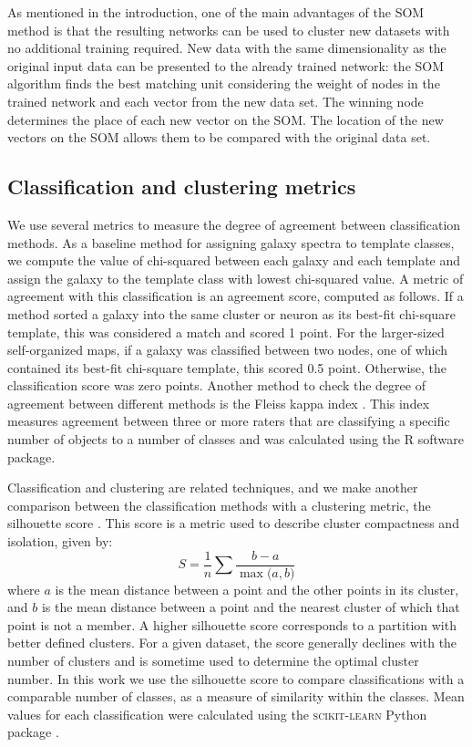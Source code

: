      As mentioned in the introduction, one of the main advantages of the SOM method is that the resulting networks can be used to cluster new datasets with no additional training required.
     New data with the same dimensionality as the original input data can be presented to the already trained network: the SOM algorithm finds the best matching unit considering the weight of nodes in the trained network and each vector from the new data set.
     The winning node determines the place of each new vector on the SOM.
     The location of the new vectors on the SOM allows them to be compared with the original data set.
     
     \subsection{Classification and clustering metrics}
     \label{sec:metrics}
     
     We use several metrics to measure the degree of agreement between classification methods. 
     As a baseline method for assigning galaxy spectra to template classes, we compute the value of chi-squared between each galaxy and each template and assign the galaxy to the template class with lowest chi-squared value. 
     A metric of agreement with this classification is an agreement score, computed as follows.
    If a method sorted a galaxy into the same cluster or neuron as its best-fit chi-square template, this was considered a match and scored 1 point. 
    For the larger-sized self-organized maps, if a galaxy was classified between two nodes, one of which contained its best-fit chi-square template, this scored 0.5 point. 
    Otherwise, the classification score was zero points.     
     Another method to check the degree of agreement between different methods is the Fleiss kappa index \citet{landis77}. 
    This index measures agreement between three or more raters that are classifying a specific number of objects to a number of classes and was calculated using the R software package.

        
        
        Classification and clustering are related techniques, and we make
        another comparison between the classification methods with a clustering metric, the silhouette score  \citep{rousseeuw87}.        
This score is a metric used to describe cluster compactness and isolation, given by:
\begin{equation}
S = \frac{1}{n} \sum{\frac{b - a}{\max\big(a, b\big)}}
\end{equation}
where $a$ is the mean distance between a point and the other points in its cluster, and $b$ is the mean distance between a point and the nearest cluster of which that point is not a member.
A higher silhouette score corresponds to a partition with better defined clusters.
For a given dataset, the score generally declines with the number of clusters and is sometime used to determine the optimal cluster number.
In this work we use the silhouette score to compare classifications with a comparable number of classes, as a measure of similarity within the classes.
Mean values for each classification were calculated using the \textsc{scikit-learn} Python package \citep{sklearn}.

     
